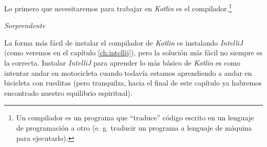 Lo primero que necesitaremos para trabajar en \textit{Kotlin} es el 
compilador.\footnote{Un compilador es un programa que \enquote{traduce} código escrito en un 
lenguaje de programación a otro (e. g. traducir un programa a lenguaje de máquina para ejecutarlo).}
\begin{center}
  \textit{Sorprendente}
\end{center}

La forma más fácil de instalar el compilador de \textit{Kotlin} es instalando 
\textit{IntelliJ} (como veremos en el capítulo \ref{ch:intellij}), pero la 
solución más fácil no siempre es la correcta.
Instalar \textit{IntelliJ} para aprender lo más básico de \textit{Kotlin} es como intentar
andar en motocicleta cuando todavía estamos aprendiendo a andar en bicicleta con rueditas (pero 
tranquilxs, hacia el final de este capítulo ya habremos encontrado nuestro equilibrio espiritual).
